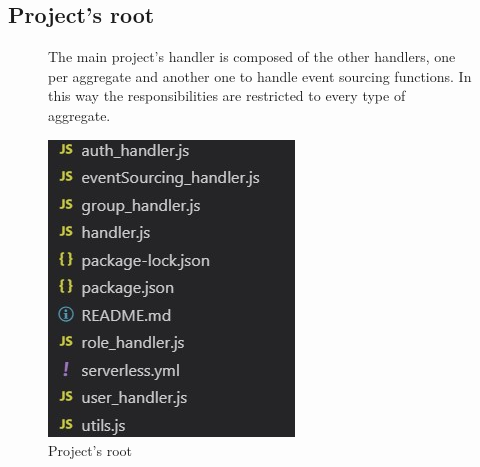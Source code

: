 \subsection{Project's root}
\begin{figure} [H]
The main project's handler is composed of the other handlers, one per aggregate and another one to handle event sourcing functions. In this way the responsibilities are restricted to every type of aggregate.

	\centering
	\includegraphics[scale=1.4]{../Img/root}
	\caption{Project's root}\label{}
\end{figure}
